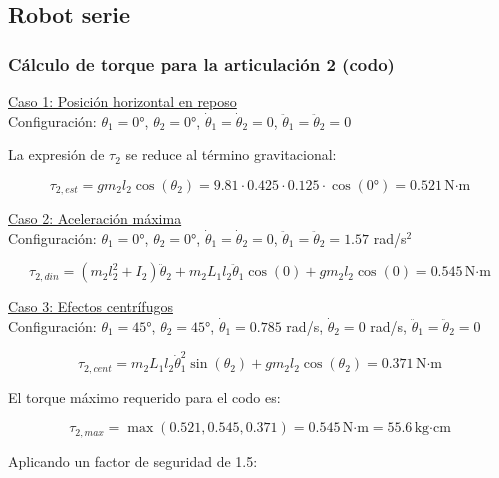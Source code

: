 
\subsection{Robot serie}
\subsubsection{Cálculo de torque para la articulación 2 (codo)}

\underline{Caso 1: Posición horizontal en reposo}\\

Configuración: $\theta_1 = 0°$, $\theta_2 = 0°$, $\dot{\theta}_1 = \dot{\theta}_2 = 0$, $\ddot{\theta}_1 = \ddot{\theta}_2 = 0$

La expresión de $\tau_2$ se reduce al término gravitacional:

\begin{equation}
\tau_{2,est} = gm_2l_2\cos(\theta_2) = 9.81 \cdot 0.425 \cdot 0.125 \cdot \cos(0°) = 0.521 \, \text{N·m}
\end{equation}

\underline{Caso 2: Aceleración máxima}\\

Configuración: $\theta_1 = 0°$, $\theta_2 = 0°$, $\dot{\theta}_1 = \dot{\theta}_2 = 0$, $\ddot{\theta}_1 = \ddot{\theta}_2 = 1.57$ rad/s$^2$

\begin{equation}
\tau_{2,din} = (m_2l_2^2 + I_2)\ddot{\theta}_2 + m_2L_1l_2\ddot{\theta}_1\cos(0) + gm_2l_2\cos(0) = 0.545 \, \text{N·m}
\end{equation}

\underline{Caso 3: Efectos centrífugos} \\

Configuración: $\theta_1 = 45°$, $\theta_2 = 45°$, $\dot{\theta}_1 = 0.785$ rad/s, $\dot{\theta}_2 = 0$ rad/s, $\ddot{\theta}_1 = \ddot{\theta}_2 = 0$

\begin{equation}
\tau_{2,cent} = m_2L_1l_2\dot{\theta}_1^2\sin(\theta_2) + gm_2l_2\cos(\theta_2)  = 0.371 \, \text{N·m}
\end{equation}

El torque máximo requerido para el codo es:

\begin{equation}
\tau_{2,max} = \max(0.521, 0.545, 0.371) = 0.545 \, \text{N·m} = 55.6 \, \text{kg·cm}
\end{equation}

Aplicando un factor de seguridad de 1.5:

